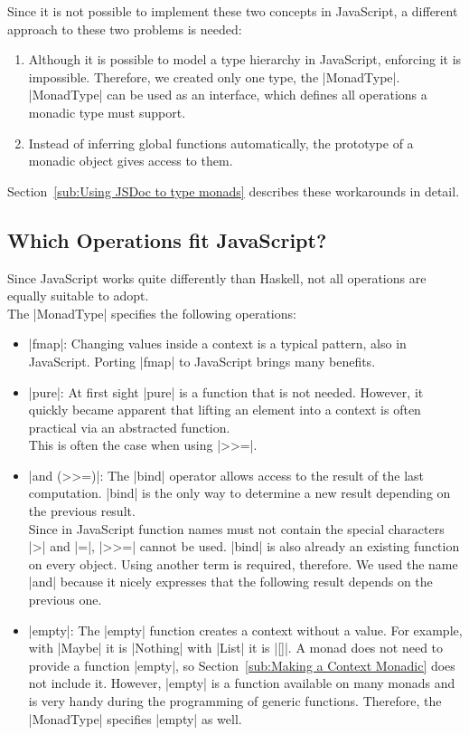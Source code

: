 Since it is not possible to implement these two concepts in JavaScript, a
different approach to these two problems is needed:
\begin{enumerate}
  \item Although it is possible to model a type hierarchy in JavaScript,
    enforcing it is impossible. Therefore, we created only one type, the
    |MonadType|. |MonadType| can be used as an interface, which defines all
    operations a monadic type must support.  
  \item Instead of inferring global functions automatically, the prototype of a
    monadic object gives access to them. \cite{mdn_prototype_2023}
\end{enumerate}
Section~\ref{sub:Using JSDoc to type monads} describes these workarounds in
detail.

\subsection{Which Operations fit JavaScript?} %
\label{sub:Which operations fit JavaScript?}
Since JavaScript works quite differently than Haskell, not all operations are
equally suitable to adopt. \\
The |MonadType| specifies the following operations:
\begin{itemize}
  \item |fmap|: Changing values inside a context is a typical pattern,
    also in JavaScript. Porting |fmap| to JavaScript brings many benefits.
  \item |pure|: At first sight |pure| is a function that is not needed.
    However, it quickly became apparent that lifting an element into a context
    is often practical via an abstracted function. 
    \\ This is often the case when using |>>=|.
  \item |and (>>=)|: The |bind| operator allows access to the result of the last
    computation. |bind| is the only way to determine a new result depending on
    the previous result. \\ Since in JavaScript function names must not contain
    the special characters |>| and |=|, |>>=| cannot be used. |bind| is also
    already an existing function on every object. Using another term is
    required, therefore. We used the name |and| because it nicely expresses
    that the following result depends on the previous one.
  \item |empty|: The |empty| function creates a context without a value. For
    example, with |Maybe| it is |Nothing| with |List| it is |[]|. A monad does
    not need to provide a function |empty|, so Section~\ref{sub:Making a
    Context Monadic} does not include it. However, |empty| is a function
    available on many monads and is very handy during the programming of
    generic functions. Therefore, the |MonadType| specifies |empty| as well.

\end{itemize}

